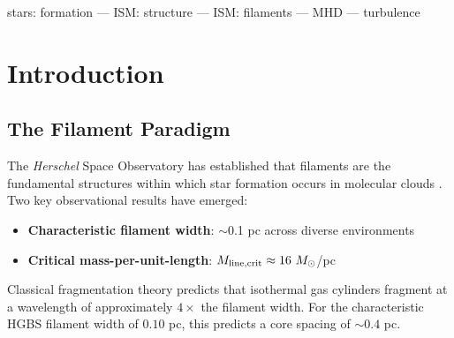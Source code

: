 \documentclass[11pt,a4paper]{article}
\begin{document}
\begin{abstract}
We also perform 3,240 simulations across the physical parameter space of finite-length effects, external pressure, magnetic fields, non-cylindrical geometry, and mass accretion, demonstrating that approximately 20.6\% of parameter combinations produce spacings in the observed range. Self-gravitating MHD simulations of a highly supercritical filament ($f = 6.6$) show that core spacing becomes independent of magnetic field strength in this regime, with $\lambda/W \approx 0.94$. The observed spacing ($\lambda/W \approx 2.1$) lies between the near-critical IM92 prediction ($\lambda/W \approx 4$) and the highly supercritical limit, suggesting real filaments are moderately supercritical ($f \approx 2$--$3$).

Together, these analyses indicate that magnetic tension is \textbf{a viable mechanism} for explaining sub-Jeans core spacing, but definitive tests require direct measurement of magnetic field geometry in HGBS filaments to verify the longitudinal-field assumption.
\end{abstract}

stars: formation --- ISM: structure --- ISM: filaments --- MHD --- turbulence

\section{Introduction}

\subsection{The Filament Paradigm}

The \textit{Herschel} Space Observatory has established that filaments are the fundamental structures within which star formation occurs in molecular clouds \citep{Andre2010}. Two key observational results have emerged:

\begin{itemize}
    \item \textbf{Characteristic filament width}: $\sim$0.1 pc across diverse environments \citep{Arzoumanian2011}
    \item \textbf{Critical mass-per-unit-length}: $M_{\rm line,crit} \approx 16~M_\odot$/pc \citep{Ostriker1964}
\end{itemize}

Classical fragmentation theory \citep{Inutsuka1992} predicts that isothermal gas cylinders fragment at a wavelength of approximately $4\times$ the filament width. For the characteristic HGBS filament width of $0.10$ pc, this predicts a core spacing of $\sim0.4$ pc.
\end{document}
